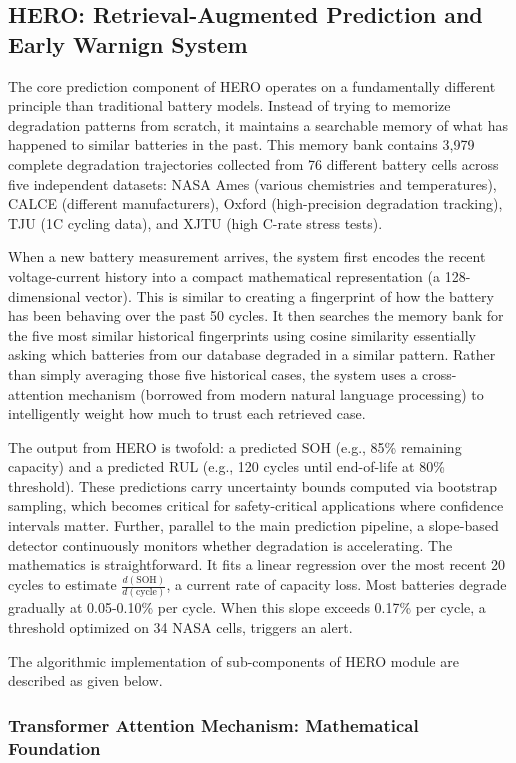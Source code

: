 \documentclass[5p,times,authoryear]{elsarticle}
\begin{document}
\subsection{HERO: Retrieval-Augmented Prediction and Early Warnign System}
The core prediction component of HERO operates on a fundamentally different principle than traditional battery models. Instead of trying to memorize degradation patterns from scratch, it maintains a searchable memory of what has happened to similar batteries in the past. This memory bank contains 3,979 complete degradation trajectories collected from 76 different battery cells across five independent datasets: NASA Ames (various chemistries and temperatures), CALCE (different manufacturers), Oxford (high-precision degradation tracking), TJU (1C cycling data), and XJTU (high C-rate stress tests).

When a new battery measurement arrives, the system first encodes the recent voltage-current history into a compact mathematical representation (a 128-dimensional vector). This is similar to creating a fingerprint of how the battery has been behaving over the past 50 cycles. It then searches the memory bank for the five most similar historical fingerprints using cosine similarity essentially asking which batteries from our database degraded in a similar pattern.
Rather than simply averaging those five historical cases, the system uses a cross-attention mechanism (borrowed from modern natural language processing) to intelligently weight how much to trust each retrieved case.

The output from HERO is twofold: a predicted SOH (e.g., 85\% remaining capacity) and a predicted RUL (e.g., 120 cycles until end-of-life at 80\% threshold). These predictions carry uncertainty bounds computed via bootstrap sampling, which becomes critical for safety-critical applications where confidence intervals matter. Further, parallel to the main prediction pipeline, a slope-based detector continuously monitors whether degradation is accelerating. The mathematics is straightforward. It fits a linear regression over the most recent 20 cycles to estimate $\frac{d(\text{SOH})}{d(\text{cycle})}$, a current rate of capacity loss. Most batteries degrade gradually at 0.05-0.10\% per cycle. When this slope exceeds 0.17\% per cycle, a threshold optimized on 34 NASA cells, triggers an alert.


The algorithmic implementation of sub-components of HERO module are described as given below.  
\subsubsection{Transformer Attention Mechanism: Mathematical Foundation}
\end{document}

